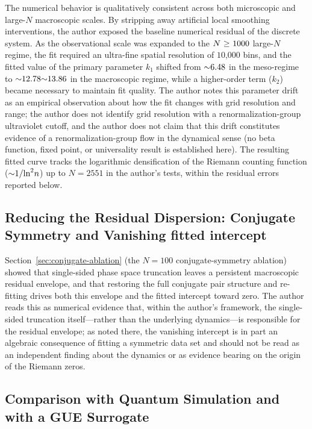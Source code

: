 \documentclass[mca,article,submit,oneauthor,pdftex]{Definitions/mdpi}
\begin{document}
The numerical behavior is qualitatively consistent across both
microscopic and large-$N$ macroscopic scales. By stripping away
artificial local smoothing interventions, the author exposed the baseline numerical residual of
the discrete system. As the
observational scale was expanded to the
\({N}~\text{\ensuremath{\ge}~1000}\) large-$N$ regime, the fit required an
ultra-fine spatial resolution of \(\text{10,000}\) bins, and the fitted
value of the primary parameter \(k_1\) shifted from
\(\text{\ensuremath{\sim}6.48}\) in the meso-regime to
\(\text{\ensuremath{\sim}12.78\ensuremath{\sim}13.86}\) in the macroscopic regime, while a
higher-order term (\(k_2\)) became necessary to maintain fit quality. The author notes this parameter drift as an empirical observation about how the fit
changes with grid resolution and range; the author does not identify grid
resolution with a renormalization-group ultraviolet cutoff, and the author does not
claim that this drift constitutes evidence of a renormalization-group flow
in the dynamical sense (no beta function, fixed point, or universality
result is established here). The resulting fitted curve tracks the
logarithmic densification of the Riemann counting function
(\(\text{\ensuremath{\sim}1/}\text{ln}^{\text{2}}{n}\)) up to \(N=2551\) in the author's
tests, within the residual errors reported below.

\subsection{Reducing the Residual Dispersion: Conjugate Symmetry and Vanishing fitted intercept}

Section~\ref{sec:conjugate-ablation} (the $N=100$ conjugate-symmetry ablation) showed
that single-sided phase space truncation leaves a persistent macroscopic
residual envelope, and that restoring the full conjugate pair structure
and re-fitting drives both this envelope and the fitted intercept toward
zero. The author reads this as numerical evidence that, within the author's framework, the
single-sided truncation itself---rather than the underlying dynamics---is
responsible for the residual envelope; as noted there, the vanishing
intercept is in part an algebraic consequence of fitting a symmetric data
set and should not be read as an independent finding about the dynamics
or as evidence bearing on the origin of the Riemann zeros.

\subsection{Comparison with Quantum Simulation and with a GUE Surrogate}\label{sec:gue-comparison}
\end{document}

